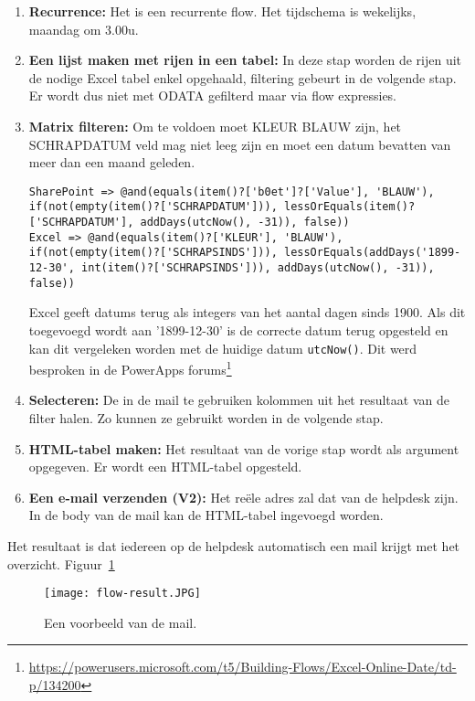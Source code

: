 \begin{enumerate}
    \item \textbf{Recurrence:} Het is een recurrente flow. Het tijdschema is wekelijks, maandag om 3.00u.
    \item \textbf{Een lijst maken met rijen in een tabel:} In deze stap worden de rijen uit de nodige Excel tabel enkel opgehaald, filtering gebeurt in de volgende stap. Er wordt dus niet met ODATA gefilterd maar via flow expressies.
    \item \textbf{Matrix filteren:} Om te voldoen moet KLEUR BLAUW zijn, het SCHRAPDATUM veld mag niet leeg zijn en moet een datum bevatten van meer dan een maand geleden.
\begin{lstlisting}
SharePoint => @and(equals(item()?['b0et']?['Value'], 'BLAUW'), if(not(empty(item()?['SCHRAPDATUM'])), lessOrEquals(item()?['SCHRAPDATUM'], addDays(utcNow(), -31)), false))
Excel => @and(equals(item()?['KLEUR'], 'BLAUW'), if(not(empty(item()?['SCHRAPSINDS'])), lessOrEquals(addDays('1899-12-30', int(item()?['SCHRAPSINDS'])), addDays(utcNow(), -31)), false))
\end{lstlisting}
    Excel geeft datums terug als integers van het aantal dagen sinds 1900. Als dit toegevoegd wordt aan '1899-12-30' is de correcte datum terug opgesteld en kan dit vergeleken worden met de huidige datum \lstinline|utcNow()|. Dit werd besproken in de PowerApps forums\footnote{\url{https://powerusers.microsoft.com/t5/Building-Flows/Excel-Online-Date/td-p/134200}}
    \item \textbf{Selecteren:} De in de mail te gebruiken kolommen uit het resultaat van de filter halen. Zo kunnen ze gebruikt worden in de volgende stap.
    \item \textbf{HTML-tabel maken:} Het resultaat van de vorige stap wordt als argument opgegeven. Er wordt een HTML-tabel opgesteld.
    \item \textbf{Een e-mail verzenden (V2):} Het reële adres zal dat van de helpdesk zijn. In de body van de mail kan de HTML-tabel ingevoegd worden.
\end{enumerate}

Het resultaat is dat iedereen op de helpdesk automatisch een mail krijgt met het overzicht. Figuur~\ref{fig:flow-result}

\begin{figure}[h!]
    \texttt{[image: flow-result.JPG]}
    \caption{Een voorbeeld van de mail.}
    \label{fig:flow-result}
\end{figure}

